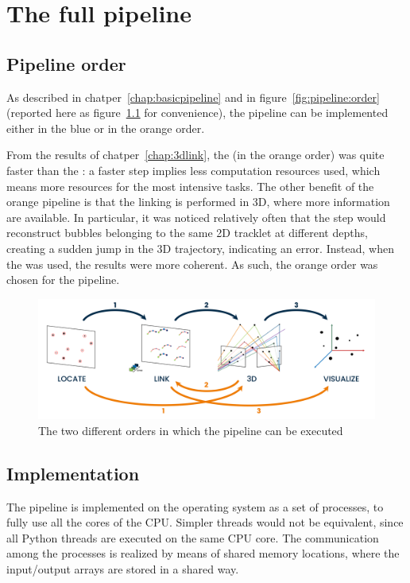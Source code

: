 \chapter{The full pipeline}
\label{chap:pipeline}

\section{Pipeline order}

As described in chatper~\ref{chap:basicpipeline} and in figure~\ref{fig:pipeline:order} (reported here as figure~\ref{fig:pipeline:order-again} for convenience), the pipeline can be implemented either in the blue or in the orange order.

From the results of chatper~\ref{chap:3dlink}, the \linkDDD* (in the orange order) was quite faster than the \linkDD*: a faster step implies less computation resources used, which means more resources for the most intensive tasks.
The other benefit of the orange pipeline is that the linking is performed in 3D, where more information are available.
In particular, it was noticed relatively often that the \match* step would reconstruct bubbles belonging to the same 2D tracklet at different depths, creating a sudden jump in the 3D trajectory, indicating an error.
Instead, when the \linkDDD* was used, the results were more coherent.
As such, the orange order was chosen for the pipeline.

\begin{figure}
	\centerline{\includegraphics[width=\textwidth]{images/pipeline-orders.png}}
	\caption{\centering The two different orders in which the pipeline can be executed}
	\label{fig:pipeline:order-again}
\end{figure}

\section{Implementation}

The pipeline is implemented on the operating system as a set of processes, to fully use all the cores of the CPU.
Simpler threads would not be equivalent, since all Python threads are executed on the same CPU core.
The communication among the processes is realized by means of shared memory locations, where the input/output arrays are stored in a shared way.

